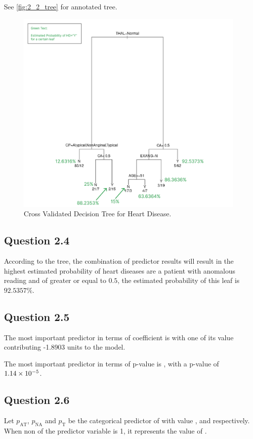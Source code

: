 \documentclass[parskip=full]{scrartcl}
\begin{document}
    See \autoref{fig:2_2_tree} for annotated tree.

    \begin{figure}
        \centering
        \includegraphics[width=0.7\linewidth]{diagrams/annotated.png}
        \caption{Cross Validated Decision Tree for Heart Disease.}
        \label{fig:2_2_tree}
    \end{figure}

    \subsection*{Question 2.4}
    
    According to the tree, the combination of predictor results will result in the highest estimated probability of heart diseases are a patient with anomalous  reading and  of greater or equal to $0.5$, the estimated probability of this leaf is $92.5357\%$.

    \subsection*{Question 2.5}

    The most important predictor in terms of coefficient is  with one of its value contributing -1.8903 units to the model.

    The most important predictor in terms of p-value is , with a p-value of $1.14\times 10^{-5}$.

    \subsection*{Question 2.6}

    Let $p_{\text{AT}}$, $p_{\text{NA}}$ and $p_{\text{T}}$ be the categorical predictor of  with value ,  and  respectively. When non of the predictor variable is 1, it represents the value of .
\end{document}
